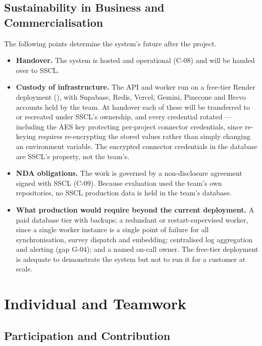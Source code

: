 \subsection{Sustainability in Business and Commercialisation}
\label{subsec:commercialisation}

The following points determine the system's future after the project.

\begin{itemize}
  \item \textbf{Handover.} The system is hosted and operational (C-08) and will
  be handed over to SSCL.
  \item \textbf{Custody of infrastructure.} The API and worker run on a
  free-tier Render deployment (), with
  Supabase, Redis, Vercel, Gemini, Pinecone and Brevo accounts held by the team.
  At handover each of these will be transferred to or recreated under SSCL's
  ownership, and every credential rotated --- including the AES key protecting
  per-project connector credentials, since re-keying requires re-encrypting the
  stored values rather than simply changing an environment variable. The
  encrypted connector credentials in the database are SSCL's property, not the
  team's.
  \item \textbf{NDA obligations.} The work is governed by a non-disclosure
  agreement signed with SSCL (C-09). Because evaluation used the team's own
  repositories, no SSCL production data is held in the team's database.
  \item \textbf{What production would require beyond the current deployment.} A
  paid database tier with backups; a redundant or restart-supervised worker,
  since a single worker instance is a single point of failure for all
  synchronisation, survey dispatch and embedding; centralised log aggregation
  and alerting (gap G-04); and a named on-call owner. The free-tier deployment
  is adequate to demonstrate the system but not to run it for a customer at
  scale.
\end{itemize}

\section{Individual and Teamwork}
\label{sec:teamwork}

\subsection{Participation and Contribution}
\label{subsec:contribution}

